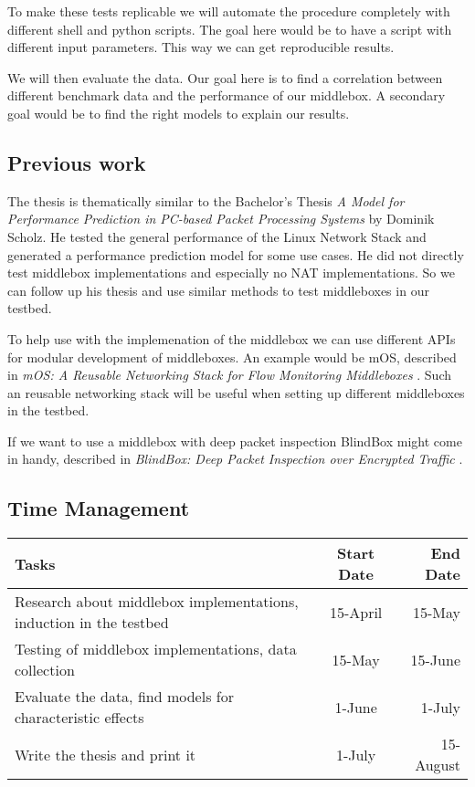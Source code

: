 \documentclass[NET,a4,12pt,ngerman]{netforms}
\begin{document}
To make these tests replicable we will automate the procedure completely with different shell and python scripts. The goal here would be to have a script with different input parameters. This way we can get reproducible results. 

We will then evaluate the data. Our goal here is to find a correlation between different benchmark data and the performance of our middlebox. A secondary goal would be to find the right models to explain our results.


\subsection*{Previous work}

The thesis is thematically similar to the Bachelor's Thesis \emph{A Model for Performance Prediction
in PC-based Packet Processing Systems} \cite{WORK:1} by
Dominik Scholz. He tested the general performance of the Linux Network Stack and generated a performance prediction model for some use cases. 
He did not directly test middlebox implementations and especially no NAT implementations. So we can follow up his thesis and use similar methods to test middleboxes in our testbed. 

To help use with the implemenation of the middlebox we can use different APIs for modular development of middleboxes. An example would be mOS, described in \emph{mOS: A Reusable Networking Stack for Flow Monitoring Middleboxes} \cite{WORK:2}. Such an reusable networking stack will be useful when setting up different middleboxes in the testbed.

If we want to use a middlebox with deep packet inspection BlindBox might come in handy, described in \emph{BlindBox: Deep Packet Inspection
over Encrypted Traffic} \cite{WORK:3}. 


\subsection*{Time Management}
 \begin{tabular}{| l | c | r |}
 	\hline 
 	\textbf{Tasks} & \textbf{Start Date} & \textbf{End Date}  \\ \hline
	Research about middlebox implementations, induction in the testbed & 15-April & 15-May \\ \hline
	Testing of middlebox implementations, data collection & 15-May & 15-June \\ \hline
	Evaluate the data, find models for characteristic effects & 1-June & 1-July \\ \hline
	Write the thesis and print it & 1-July & 15-August \\ 
	\hline
 \end{tabular}




\end{document}
